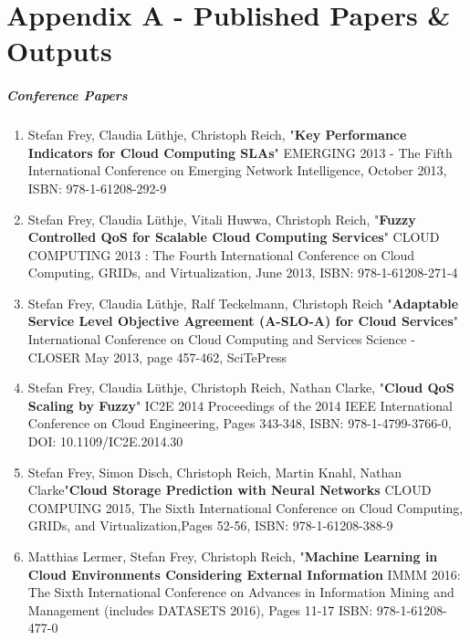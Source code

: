 %
%

\chapter{Appendix A - Published Papers \& Outputs}
\label{app:app01}
\paragraph{Conference Papers}
\begin{enumerate}
	\item Stefan Frey, Claudia L\"uthje, Christoph Reich, "\textbf{Key Performance Indicators for Cloud Computing SLAs}"
	EMERGING 2013 - The Fifth International Conference on Emerging Network Intelligence, October 2013, ISBN: 978-1-61208-292-9
	
	\item Stefan Frey, Claudia L\"uthje, Vitali Huwwa, Christoph Reich, "\textbf{Fuzzy Controlled QoS for Scalable Cloud Computing Services}" CLOUD COMPUTING 2013 : The Fourth International Conference on Cloud Computing, GRIDs, and Virtualization, June 2013, ISBN: 978-1-61208-271-4
	
	\item Stefan Frey, Claudia L\"uthje, Ralf Teckelmann, Christoph Reich "\textbf{Adaptable Service Level Objective Agreement (A-SLO-A) for Cloud Services}" International Conference on Cloud Computing and Services Science - CLOSER May 2013, page 457-462, SciTePress
	
	\item Stefan Frey, Claudia L\"uthje, Christoph Reich, Nathan Clarke, "\textbf{Cloud QoS Scaling by Fuzzy}" IC2E 2014 Proceedings of the 2014 IEEE International Conference on Cloud Engineering, Pages 343-348, ISBN: 978-1-4799-3766-0, DOI: 10.1109/IC2E.2014.30
	
	\item Stefan Frey, Simon Disch, Christoph Reich, Martin Knahl, Nathan Clarke"\textbf{Cloud Storage Prediction with Neural Networks} CLOUD COMPUING 2015, The Sixth International Conference on Cloud Computing, GRIDs, and Virtualization,Pages 52-56, ISBN: 978-1-61208-388-9
	
	\item Matthias Lermer, Stefan Frey,	Christoph Reich, "\textbf{Machine Learning in Cloud Environments Considering External Information} IMMM 2016: The Sixth International Conference on Advances in Information Mining and Management (includes DATASETS 2016), Pages 11-17 ISBN: 978-1-61208-477-0
	
\end{enumerate}


